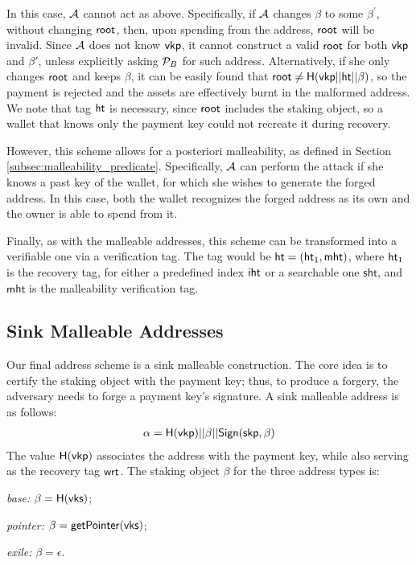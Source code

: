 In this case, $\mathcal{A}$ cannot act as above. Specifically, if $\mathcal{A}$
changes $\beta$ to some $\beta^\prime$, without changing $\mathsf{root}$, then, upon
spending from the address, $\mathsf{root}$ will be invalid. Since $\mathcal{A}$ does not
know $\mathsf{vkp}$, it cannot construct a valid $\mathsf{root}$ for both
$\mathsf{vkp}$ and $\beta'$, unless explicitly asking $\mathcal{P}_{B}$ for
such address. Alternatively, if she only changes $\mathsf{root}$ and keeps $\beta$, it
can be easily found that $\mathsf{root} \neq \mathsf{H}(\mathsf{vkp} || \mathsf{ht} || \beta)$,
so the payment is rejected and the assets are effectively burnt in the
malformed address. We note that tag $\mathsf{ht}$ is necessary, since $\mathsf{root}$ includes
the staking object, so a wallet that knows only the payment key could not
recreate it during recovery.

However, this scheme allows for a posteriori malleability, as defined in
Section \ref{subsec:malleability_predicate}. Specifically, $\mathcal{A}$ can
perform the attack if she knows a past key of the wallet, for which she wishes
to generate the forged address. In this case, both the wallet recognizes
the forged address as its own and the owner is able to spend from it.

Finally, as with the malleable addresses, this scheme can be transformed into a
verifiable one via a verification tag. The tag would be $\mathsf{ht} = (\mathsf{ht}_1, \mathsf{mht})$,
where $\mathsf{ht}_1$ is the recovery tag, for either a predefined index $\mathsf{iht}$ or a
searchable one $\mathsf{sht}$, and $\mathsf{mht}$ is the malleability verification tag.

\subsection{Sink Malleable Addresses}\label{subsec:nm-genaddr}

Our final address scheme is a sink malleable construction. The core idea is to
certify the staking object with the payment key; thus, to produce a forgery,
the adversary needs to forge a payment key's signature. A sink malleable
address is as follows:
\begin{align}
    \alpha = \mathsf{H}(\mathsf{vkp}) || \beta || \mathsf{Sign}(\mathsf{skp}, \beta)
\end{align}
The value $\mathsf{H}(\mathsf{vkp})$ associates the address with the payment
key, while also serving as the recovery tag $\mathsf{wrt}$. The staking object $\beta$
for the three address types is:
\begin{inparaenum}[i)]
    \item \emph{base:} $\beta = \mathsf{H}(\mathsf{vks})$;
    \item \emph{pointer:} $\beta = \mathsf{getPointer}(\mathsf{vks})$;
    \item \emph{exile:} $\beta = \epsilon$.
\end{inparaenum}

